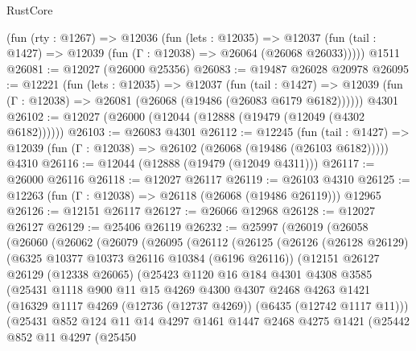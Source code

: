 \begin{lexlean}{RustCore}
\begin{coremodule}
    (fun (rty : @1267) =>
    @12036
      (fun (lets : @12035) =>
      @12037 (fun (tail : @1427) => @12039 (fun (Γ : @12038) => @26064 (@26068 @26033)))))
    @1511
@26081 := @12027 (@26000 @25356)
@26083 := @19487 @26028 @20978
@26095 := @12221
    (fun (lets : @12035) =>
    @12037
      (fun (tail : @1427) =>
      @12039 (fun (Γ : @12038) => @26081 (@26068 (@19486 (@26083 @6179 @6182))))))
    @4301
@26102 := @12027 (@26000 (@12044 (@12888 (@19479 (@12049 (@4302 @6182))))))
@26103 := @26083 @4301
@26112 := @12245
    (fun (tail : @1427) => @12039 (fun (Γ : @12038) => @26102 (@26068 (@19486 (@26103 @6182)))))
    @4310
@26116 := @12044 (@12888 (@19479 (@12049 @4311)))
@26117 := @26000 @26116
@26118 := @12027 @26117
@26119 := @26103 @4310
@26125 := @12263 (fun (Γ : @12038) => @26118 (@26068 (@19486 @26119))) @12965
@26126 := @12151 @26117
@26127 := @26066 @12968
@26128 := @12027 @26127
@26129 := @25406 @26119
@26232 := @25997
    (@26019
      (@26058
        (@26060
          (@26062
            (@26079
              (@26095
                (@26112
                  (@26125
                    (@26126
                      (@26128 @26129)
                      (@6325 @10377 @10373 @26116 @10384 (@6196 @26116))
                      (@12151
                        @26127
                        @26129
                        (@12338 @26065)
                        (@25423
                          @1120
                          @16
                          @184
                          @4301
                          @4308
                          @3585
                          (@25431
                            @1118
                            @900
                            @11
                            @15
                            @4269
                            @4300
                            @4307
                            @2468
                            @4263
                            @1421
                            (@16329 @1117 @4269 (@12736 (@12737 @4269)) (@6435 (@12742 @1117 @11)))
                            (@25431
                              @852
                              @124
                              @11
                              @14
                              @4297
                              @1461
                              @1447
                              @2468
                              @4275
                              @1421
                              (@25442
                                @852
                                @11
                                @4297
                                (@25450

\end{coremodule}
\end{lexlean}
